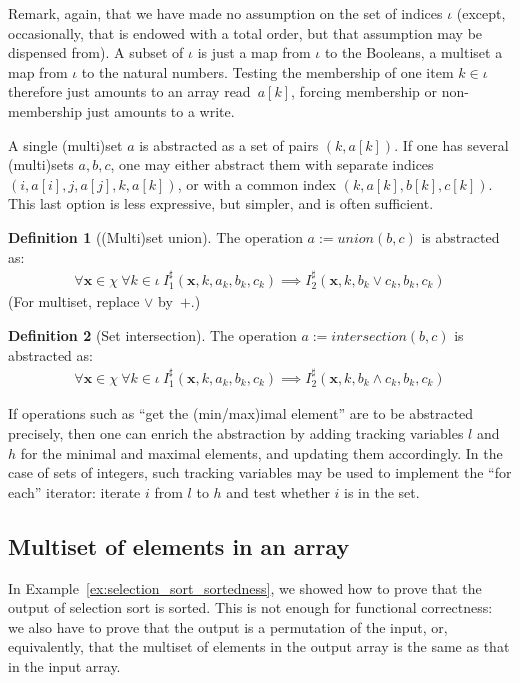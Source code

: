 \documentclass[a4paper]{article}
\newcommand{\ve}[1]{\mathbf{#1}}
\newcommand{\vx}{\ve{x}}
\newcommand{\abstr}[1]{#1^\sharp}
\theoremstyle{definition}
\newtheorem{definition}{Definition}
\theoremstyle{plain}
\begin{document}
Remark, again, that we have made no assumption on the set of indices $\iota$ (except, occasionally, that is endowed with a total order, but that assumption may be dispensed from).
A subset of $\iota$ is just a map from $\iota$ to the Booleans, a multiset a map from $\iota$ to the natural numbers.
Testing the membership of one item $k \in \iota$ therefore just amounts to an array read~$a[k]$, forcing membership or non-membership just amounts to a write.

A single (multi)set $a$ is abstracted as a set of pairs $(k,a[k])$. If one has several (multi)sets $a,b,c$, one may either abstract them with separate indices $(i,a[i],j,a[j],k,a[k])$, or with a common index $(k,a[k],b[k],c[k])$. This last option is less expressive, but simpler, and is often sufficient.

\begin{definition}[(Multi)set union]
The operation $a:=\mathit{union}(b,c)$ is abstracted as:
\begin{align}
\forall \vx \in \chi~ \forall k \in \iota~
  \abstr{I}_1(\vx, k, a_k, b_k, c_k) \implies
  \abstr{I}_2(\vx, k, b_k \lor c_k, b_k, c_k)
\end{align}
(For multiset, replace $\lor$ by~$+$.)
\end{definition}

\begin{definition}[Set intersection]
The operation $a:=\mathit{intersection}(b,c)$ is abstracted as:
\begin{align}
\forall \vx \in \chi~ \forall k \in \iota~
  \abstr{I}_1(\vx, k, a_k, b_k, c_k) \implies
  \abstr{I}_2(\vx, k, b_k \land c_k, b_k, c_k)
\end{align}
\end{definition}

If operations such as ``get the (min/max)imal element'' are to be abstracted precisely, then one can enrich the abstraction by adding tracking variables $l$ and $h$ for the minimal and maximal elements, and updating them accordingly.
In the case of sets of integers, such tracking variables may be used to implement the ``for each'' iterator: iterate $i$ from $l$ to $h$ and test whether $i$ is in the set.


\subsection{Multiset of elements in an array}
\label{sec:multiset_of_elements}
In Example~\ref{ex:selection_sort_sortedness}, we showed how to prove that the output of selection sort is sorted. This is not enough for functional correctness: we also have to prove that the output is a permutation of the input, or, equivalently, that the multiset of elements in the output array is the same as that in the input array.
\end{document}
